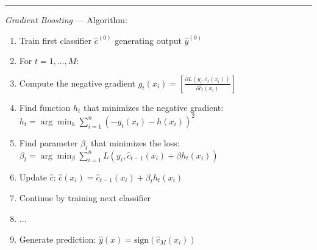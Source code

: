 {\color{lightgray}\hrule height 0.001mm}

\emph{Gradient Boosting} --- 
Algorithm:
\begin{enumerate}
    \item Train first classifier $\hat{c}^{(0)}$ generating output $\hat{y}^{(0)}$
    \item For $t = 1, ..., M$:
    \item Compute the negative gradient $g_t(x_i) = [\frac{\partial L(y_i, \hat{c}_t(x_i))}{\partial \hat{c}_t(x_i)}]$
    \item Find function $h_t$ that minimizes the negative gradient: $h_t = \arg\min_h \sum_{i=1}^n (-g_t(x_i) - h(x_i))^2$
    \item Find parameter $\beta_t$ that minimizes the loss: $\beta_t = \arg\min_\beta \sum_{i=1}^n L(y_i, \hat{c}_{t-1}(x_i) + \beta h_t(x_i))$
    \item Update $\hat{c}$: $\hat{c}(x_i) = \hat{c}_{t-1}(x_i) + \beta_t h_t(x_i)$
    \item Continue by training next classifier
    \item ...
    \item Generate prediction: $\hat{y}(x) = \textrm{sign}(\hat{c}_{M}(x_i))$
\end{enumerate}
